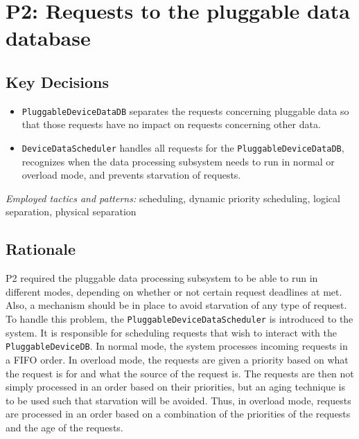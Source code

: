 \section{P2: Requests to the pluggable data database}

    \subsection*{Key Decisions}

        \begin{itemize}
            \item \texttt{PluggableDeviceDataDB} separates the requests concerning pluggable data
                  so that those requests have no impact on requests concerning other data.
        	\item \texttt{DeviceDataScheduler} handles all requests for the \texttt{PluggableDeviceDataDB},
                  recognizes when the data processing subsystem needs to run in normal or overload mode,
                  and prevents starvation of requests.
        \end{itemize}
    \emph{Employed tactics and patterns:} scheduling, dynamic priority scheduling, logical separation, physical separation

    \subsection*{Rationale}
        P2 required the pluggable data processing subsystem to be able to run in different
        modes, depending on whether or not certain request deadlines at met. Also,
        a mechanism should be in place to avoid starvation of any type of request.
        To handle this problem, the \texttt{PluggableDeviceDataScheduler} is
        introduced to the system.
        It is responsible for scheduling requests that wish to interact with
        the \texttt{PluggableDeviceDB}. In normal mode, the system processes
        incoming requests in a FIFO order. In overload mode, the requests are
        given a priority based on what the request is for and what the source
        of the request is. The requests are then not simply processed in an
        order based on their priorities, but an aging technique is to be used
        such that starvation will be avoided. Thus, in overload mode,
        requests are processed in an order based on a combination of the
        priorities of the requests and the age of the requests. \\

